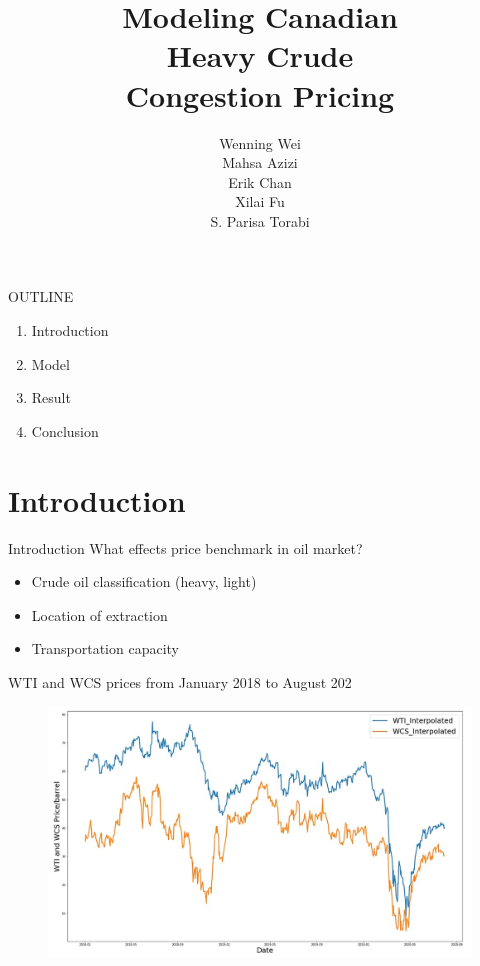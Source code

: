 \documentclass[aspectratio = 169]{beamer}
\author[]{Wenning Wei\\ Mahsa Azizi\\ Erik Chan\\ Xilai Fu\\ S. Parisa Torabi}
\title{Modeling Canadian\protect\\ Heavy Crude\protect\\ Congestion Pricing}
\begin{document}
\begin{frame}{OUTLINE}
\begin{enumerate}
\setlength\itemsep{2em}
    \item\Large{Introduction}
    \item Model
    \item Result
    \item Conclusion
\end{enumerate}
\end{frame}

\section{Introduction}
\begin{frame}{Introduction}
\Large{What effects price benchmark in oil market?}


\begin{itemize}
\setlength\itemsep{2em}
    \item \Large{Crude oil classification (heavy, light)} 
    \item \Large{Location of extraction}
    \item \Large{Transportation capacity}
\end{itemize}
\end{frame}

\begin{frame}{}
\Large{WTI and WCS prices from January 2018 to August 202}
 \begin{figure}
\includegraphics[scale=0.3]{OM-images/price.PNG}
\end{figure}
\end{frame}
\end{document}
